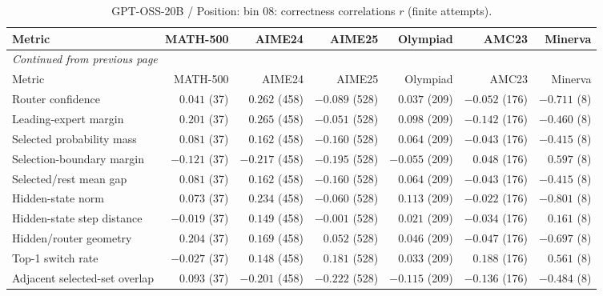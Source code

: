 \begingroup\scriptsize\setlength{\tabcolsep}{4pt}
\begin{longtable}{@{}lrrrrrr@{}}
\caption{GPT-OSS-20B / Position: bin 08: correctness correlations $r$ (finite attempts).}\label{tab:multi-gptoss-position-bin_08}\\
\toprule
Metric & MATH-500 & AIME24 & AIME25 & Olympiad & AMC23 & Minerva \\
\midrule\endfirsthead
\multicolumn{7}{l}{\textit{Continued from previous page}}\\
\toprule
Metric & MATH-500 & AIME24 & AIME25 & Olympiad & AMC23 & Minerva \\
\midrule\endhead
\bottomrule\endfoot
Router confidence & $0.041$ (37) & $0.262$ (458) & $-0.089$ (528) & $0.037$ (209) & $-0.052$ (176) & $-0.711$ (8) \\
Leading-expert margin & $0.201$ (37) & $0.265$ (458) & $-0.051$ (528) & $0.098$ (209) & $-0.142$ (176) & $-0.460$ (8) \\
Selected probability mass & $0.081$ (37) & $0.162$ (458) & $-0.160$ (528) & $0.064$ (209) & $-0.043$ (176) & $-0.415$ (8) \\
Selection-boundary margin & $-0.121$ (37) & $-0.217$ (458) & $-0.195$ (528) & $-0.055$ (209) & $0.048$ (176) & $0.597$ (8) \\
Selected/rest mean gap & $0.081$ (37) & $0.162$ (458) & $-0.160$ (528) & $0.064$ (209) & $-0.043$ (176) & $-0.415$ (8) \\
Hidden-state norm & $0.073$ (37) & $0.234$ (458) & $-0.060$ (528) & $0.113$ (209) & $-0.022$ (176) & $-0.801$ (8) \\
Hidden-state step distance & $-0.019$ (37) & $0.149$ (458) & $-0.001$ (528) & $0.021$ (209) & $-0.034$ (176) & $0.161$ (8) \\
Hidden/router geometry & $0.204$ (37) & $0.169$ (458) & $0.052$ (528) & $0.046$ (209) & $-0.047$ (176) & $-0.697$ (8) \\
Top-1 switch rate & $-0.027$ (37) & $0.148$ (458) & $0.181$ (528) & $0.033$ (209) & $0.188$ (176) & $0.561$ (8) \\
Adjacent selected-set overlap & $0.093$ (37) & $-0.201$ (458) & $-0.222$ (528) & $-0.115$ (209) & $-0.136$ (176) & $-0.484$ (8) \\
\end{longtable}\endgroup


